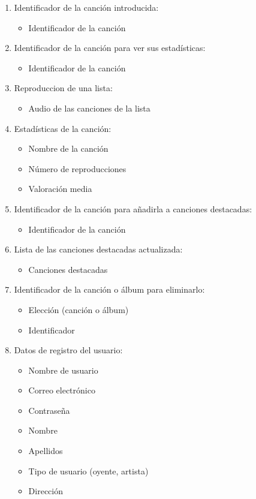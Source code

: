 \documentclass[12pt,a4paper]{article}
\begin{document}
\begin{enumerate}[label=\textnormal{RD\arabic*}]
	\item  Identificador de la canción introducida: \label{rd12}
		\begin{itemize}
			\item Identificador de la canción
		\end{itemize}
		
	\item Identificador de la canción para ver sus estadísticas: \label{rd13}
		\begin{itemize}
			\item Identificador de la canción
		\end{itemize}
		
	\item Reproduccion de una lista: \label{rd14}
		\begin{itemize}
		   	\item Audio de las canciones de la lista
		\end{itemize}
		
	\item Estadísticas de la canción: \label{rd15}
		\begin{itemize}
		    \item Nombre de la canción
		    \item Número de reproducciones
		    \item Valoración media
		\end{itemize}
		
	\item Identificador de la canción para añadirla a canciones destacadas: \label{rd16}
		\begin{itemize}
			\item Identificador de la canción
		\end{itemize}
		
	\item Lista de las canciones destacadas actualizada: \label{rd17}
		\begin{itemize}
			\item Canciones destacadas
		\end{itemize}
		
	\item Identificador de la canción o álbum para eliminarlo: \label{rd18}
		\begin{itemize}
			\item Elección (canción o álbum)
			\item Identificador
		\end{itemize}
		
	\item Datos de registro del usuario: \label{rd19}
		\begin{itemize}
			\item Nombre de usuario
			\item Correo electrónico
			\item Contraseña
			\item Nombre
			\item Apellidos
			\item Tipo de usuario (oyente, artista)
			\item Dirección
		\end{itemize}
		

\end{enumerate}
\end{document}
